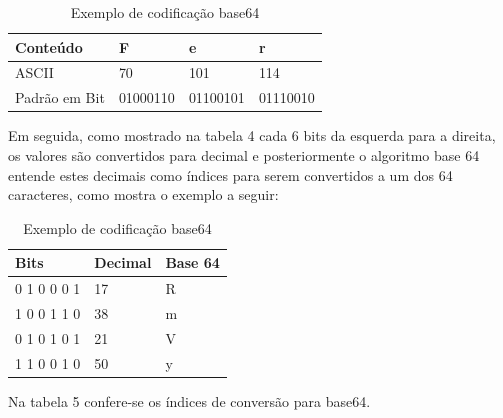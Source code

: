 \documentclass[12pt]{article}
\begin{document}
\begin{table}[ht]
	\centering
	\caption{Exemplo de codificação base64}
	\label{tab:Table3}
	\smallskip
	\begin{tabular}{ |l|l|l|l| }
		\hline
		Conteúdo & F & e & r \\ \hline
		ASCII & 70 & 101 & 114 \\ \hline
		Padrão em Bit & 01000110 & 01100101 & 01110010\\ \hline
	\end{tabular}
\end{table}

Em seguida, como mostrado na tabela 4 cada 6 bits da esquerda para a direita, os valores são convertidos para decimal e posteriormente o algoritmo base 64 entende estes decimais como índices para serem convertidos a um dos 64 caracteres, como mostra o exemplo a seguir:

\begin{table}[ht]
	\centering
	\caption{Exemplo de codificação base64}
	\label{tab:Table4}
	\smallskip
	\begin{tabular}{ |l|l|l| }
		\hline
		Bits & Decimal & Base 64\\ \hline
		0 1 0 0 0 1 & 17 & R \\ \hline
		1 0 0 1 1 0 & 38 & m \\ \hline
		0 1 0 1 0 1 & 21 & V \\ \hline
		1 1 0 0 1 0 & 50 & y \\ \hline
	\end{tabular}
\end{table}

Na tabela 5 confere-se os índices de conversão para base64.
\end{document}
